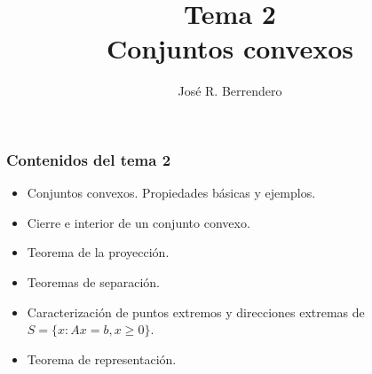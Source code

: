\documentclass{beamer}
\title[Estad\'{\i}stica: Tema 2]{Tema 2\\
Conjuntos convexos}
\author[Berrendero]
{Jos\'{e} R. Berrendero}
\date{}
\institute{Departamento de Matem\'{a}ticas\\
 Universidad Aut\'{o}noma de Madrid}
\begin{document}



\frame{\titlepage}
\begin{frame}[plain]
\frametitle{Contenidos del tema 2}

\begin{itemize}
 

  \item Conjuntos convexos. Propiedades básicas y ejemplos.
  \item Cierre e interior de un conjunto convexo.
  \item Teorema de la proyección.
  \item Teoremas de separación.
  \item Caracterización de puntos extremos  y direcciones extremas de  $S=\{x: Ax=b, x\geq 0\}$.
  \item Teorema de representación.
 
\end{itemize}


\end{frame}
\end{document}
